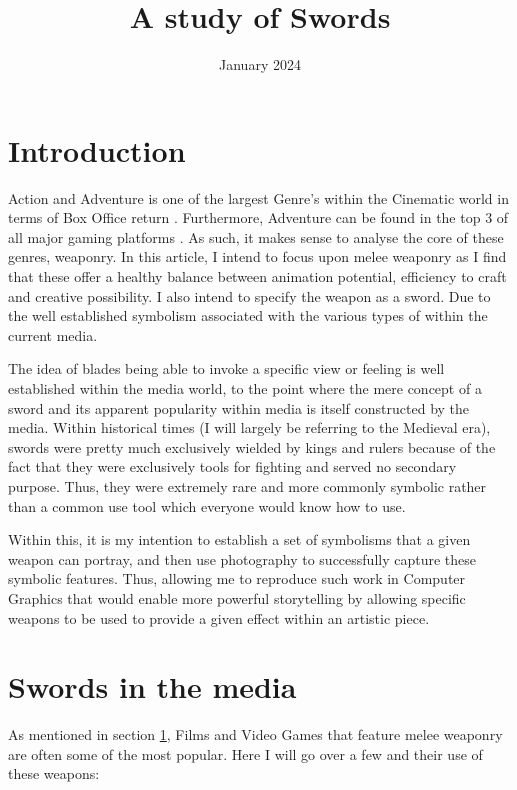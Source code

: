 \documentclass{article}
\title{A study of Swords}
\date{January 2024}
\begin{document}
\maketitle

\pagebreak

\tableofcontents

\pagebreak

\section{Introduction} \label{intro}
Action and Adventure is one of the largest Genre's within the Cinematic world in terms of Box Office return \parencite{3}. Furthermore, Adventure can be found in the top 3 of all major gaming platforms \parencite{4}. As such, it makes sense to analyse the core of these genres, weaponry. In this article, I intend to focus upon melee weaponry as I find that these offer a healthy balance between animation potential, efficiency to craft and creative possibility. I also intend to specify the weapon as a sword. Due to the well established symbolism associated with the various types of within the current media.

The idea of blades being able to invoke a specific view or feeling is well established within the media world, to the point where the mere concept of a sword and its apparent popularity within media is itself constructed by the media. Within historical times (I will largely be referring to the Medieval era), swords were pretty much exclusively wielded by kings and rulers because of the fact that they were exclusively tools for fighting and served no secondary purpose. Thus, they were extremely rare and more commonly symbolic rather than a common use tool which everyone would know how to use.

Within this, it is my intention to establish a set of symbolisms that a given weapon can portray, and then use photography to successfully capture these symbolic features. Thus, allowing me to reproduce such work in Computer Graphics that would enable more powerful storytelling by allowing specific weapons to be used to provide a given effect within an artistic piece.
\pagebreak


\section{Swords in the media} \label{media}
As mentioned in section \ref{intro}, Films and Video Games that feature melee weaponry are often some of the most popular. Here I will go over a few and their use of these weapons:
\end{document}
